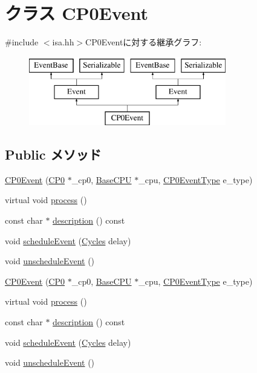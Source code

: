 \hypertarget{classMipsISA_1_1ISA_1_1CP0Event}{
\section{クラス CP0Event}
\label{classMipsISA_1_1ISA_1_1CP0Event}
}


{\ttfamily \#include $<$isa.hh$>$}CP0Eventに対する継承グラフ:\begin{figure}[H]
\begin{center}
\leavevmode
\includegraphics[height=3cm]{classMipsISA_1_1ISA_1_1CP0Event}
\end{center}
\end{figure}
\subsection*{Public メソッド}
\begin{DoxyCompactItemize}
\item 
\hyperlink{classMipsISA_1_1ISA_1_1CP0Event_a848116217afbda1fa62cd60e15a62549}{CP0Event} (\hyperlink{classMipsISA_1_1ISA}{CP0} $\ast$\_\-cp0, \hyperlink{classBaseCPU}{BaseCPU} $\ast$\_\-cpu, \hyperlink{classMipsISA_1_1ISA_a7b22e0667d062181e0dcaa5cf0e66ba7}{CP0EventType} e\_\-type)
\item 
virtual void \hyperlink{classMipsISA_1_1ISA_1_1CP0Event_a2e9c5136d19b1a95fc427e0852deab5c}{process} ()
\item 
const char $\ast$ \hyperlink{classMipsISA_1_1ISA_1_1CP0Event_a5a14fe478e2393ff51f02e9b7be27e00}{description} () const 
\item 
void \hyperlink{classMipsISA_1_1ISA_1_1CP0Event_af53dcbdc9da1cc615d43ff3bd2b4162c}{scheduleEvent} (\hyperlink{classm5_1_1params_1_1Cycles}{Cycles} delay)
\item 
void \hyperlink{classMipsISA_1_1ISA_1_1CP0Event_a8521a64adc8d310754330bc7dfe48831}{unscheduleEvent} ()
\item 
\hyperlink{classMipsISA_1_1ISA_1_1CP0Event_a848116217afbda1fa62cd60e15a62549}{CP0Event} (\hyperlink{classMipsISA_1_1ISA}{CP0} $\ast$\_\-cp0, \hyperlink{classBaseCPU}{BaseCPU} $\ast$\_\-cpu, \hyperlink{classMipsISA_1_1ISA_a7b22e0667d062181e0dcaa5cf0e66ba7}{CP0EventType} e\_\-type)
\item 
virtual void \hyperlink{classMipsISA_1_1ISA_1_1CP0Event_a6780fc1879338e1ff38faf7279ec6a0b}{process} ()
\item 
const char $\ast$ \hyperlink{classMipsISA_1_1ISA_1_1CP0Event_a2bd90422eece9190794479e08092a252}{description} () const 
\item 
void \hyperlink{classMipsISA_1_1ISA_1_1CP0Event_af53dcbdc9da1cc615d43ff3bd2b4162c}{scheduleEvent} (\hyperlink{classm5_1_1params_1_1Cycles}{Cycles} delay)
\item 
void \hyperlink{classMipsISA_1_1ISA_1_1CP0Event_a8521a64adc8d310754330bc7dfe48831}{unscheduleEvent} ()
\end{DoxyCompactItemize}
